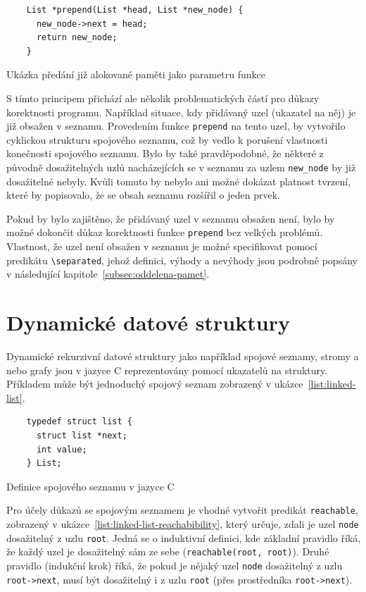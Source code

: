 \begin{listing}[H]
    \begin{verbatim}
    List *prepend(List *head, List *new_node) {
      new_node->next = head;
      return new_node;
    }
    \end{verbatim}
    \caption{Ukázka předání již alokované paměti jako parametru funkce}
    \label{list:prepend}
\end{listing}

S tímto principem přichází ale několik problematických částí pro důkazy korektnosti programu.
Například situace, kdy přidávaný uzel (ukazatel na něj) je již obsažen v seznamu.
Provedením funkce \texttt{prepend} na tento uzel,
by vytvořilo cyklickou strukturu spojového seznamu,
což by vedlo k porušení vlastnosti konečnosti spojového seznamu.
Bylo by také pravděpodobné, že některé z původně dosažitelných uzlů
nacházejících se v seznamu za uzlem \texttt{new\_node}
by již dosažitelné nebyly.
Kvůli tomuto by nebylo ani možné dokázat platnost tvrzení,
které by popisovalo, že se obsah seznamu rozšířil o jeden prvek.

Pokud by bylo zajištěno, že přidávaný uzel v seznamu obsažen není,
bylo by možné dokončit důkaz korektnosti funkce \texttt{prepend} bez velkých problémů.
Vlastnost, že uzel není obsažen v seznamu je možné specifikovat pomocí predikátu \texttt{\textbackslash separated},
jehož definici, výhody a nevýhody jsou podrobně popsány v následující kapitole~\ref{subsec:oddelena-pamet}.

\section{Dynamické datové struktury}
\label{sec:dynamicke-datove-struktury}

Dynamické rekurzivní datové struktury jako například spojové seznamy,
stromy a nebo grafy jsou v jazyce C reprezentovány pomocí ukazatelů na struktury.
Příkladem může být jednoduchý spojový seznam zobrazený v ukázce~\ref{list:linked-list}.

\begin{listing}[H]
    \begin{verbatim}
    typedef struct list {
      struct list *next;
      int value;
    } List;
    \end{verbatim}
    \caption{Definice spojového seznamu v jazyce C}
    \label{list:linked-list}
\end{listing}

Pro účely důkazů se spojovým seznamem je vhodné vytvořit predikát \texttt{reachable},
zobrazený v ukázce~\ref{list:linked-list-reachabibility},
který určuje, zdali je uzel \texttt{node} dosažitelný z uzlu \texttt{root}.
Jedná se o induktivní definici,
kde základní pravidlo říká,
že každý uzel je dosažitelný sám ze sebe (\texttt{reachable(root, root)}).
Druhé pravidlo (indukční krok) říká,
že pokud je nějaký uzel \texttt{node} dosažitelný z uzlu \texttt{root->next},
musí být dosažitelný i z uzlu \texttt{root} (přes prostředníka \texttt{root->next}).

